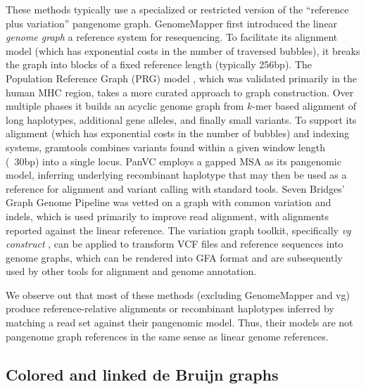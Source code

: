 These methods typically use a specialized or restricted version of the ``reference plus variation'' pangenome graph.
GenomeMapper \cite{Schneeberger_2009} first introduced the linear \emph{genome graph} a reference system for resequencing.
To facilitate its alignment model (which has exponential costs in the number of traversed bubbles), it breaks the graph into blocks of a fixed reference length (typically 256bp).
The Population Reference Graph (PRG) model \cite{dilthey2015improved}, which was validated primarily in the human MHC region, takes a more curated approach to graph construction.
Over multiple phases it builds an acyclic genome graph from $k$-mer based alignment of long haplotypes, additional gene alleles, and finally small variants.
To support its alignment (which has exponential costs in the number of bubbles) and indexing systems, gramtools \cite{Maciuca_2016} combines variants found within a given window length (~30bp) into a single locus.
PanVC \cite{Valenzuela_2018} employs a gapped MSA as its pangenomic model, inferring underlying recombinant haplotype that may then be used as a reference for alignment and variant calling with standard tools.
Seven Bridges' Graph Genome Pipeline \cite{Rakocevic_2019} was vetted on a graph with common variation and indels, which is used primarily to improve read alignment, with alignments reported against the linear reference.
The variation graph toolkit, specifically \textit{vg construct} \cite{Garrison_2018}, can be applied to transform VCF files and reference sequences into genome graphs, which can be rendered into GFA format and are subsequently used by other tools for alignment and genome annotation.

We observe out that most of these methods (excluding GenomeMapper and vg) produce reference-relative alignments or recombinant haplotypes inferred by matching a read set against their pangenomic model.
Thus, their models are not pangenome graph references in the same sense as linear genome references.

\subsection{Colored and linked de Bruijn graphs}

